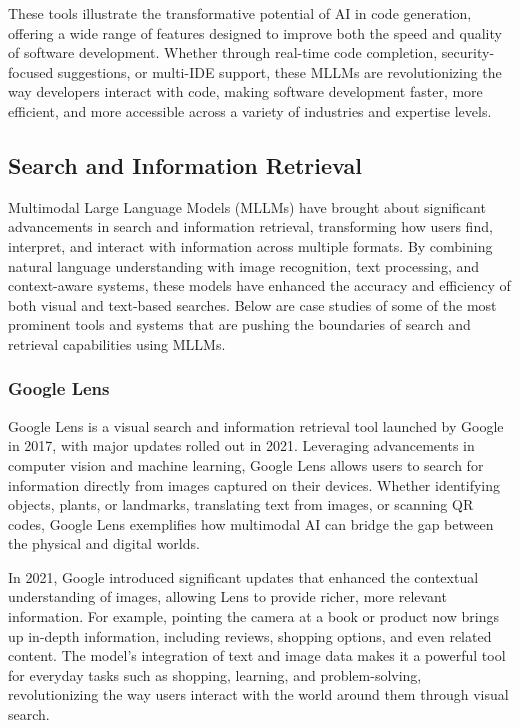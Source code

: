 These tools illustrate the transformative potential of AI in code generation, offering a wide range of features designed to improve both the speed and quality of software development. Whether through real-time code completion, security-focused suggestions, or multi-IDE support, these MLLMs are revolutionizing the way developers interact with code, making software development faster, more efficient, and more accessible across a variety of industries and expertise levels.

\subsection{Search and Information Retrieval}

Multimodal Large Language Models (MLLMs) have brought about significant advancements in search and information retrieval, transforming how users find, interpret, and interact with information across multiple formats. 
By combining natural language understanding with image recognition, text processing, and context-aware systems, these models have enhanced the accuracy and efficiency of both visual and text-based searches. 
Below are case studies of some of the most prominent tools and systems that are pushing the boundaries of search and retrieval capabilities using MLLMs.

\subsubsection{Google Lens}

Google Lens is a visual search and information retrieval tool launched by Google in 2017, with major updates rolled out in 2021. 
Leveraging advancements in computer vision and machine learning, Google Lens allows users to search for information directly from images captured on their devices. 
Whether identifying objects, plants, or landmarks, translating text from images, or scanning QR codes, Google Lens exemplifies how multimodal AI can bridge the gap between the physical and digital worlds.

In 2021, Google introduced significant updates that enhanced the contextual understanding of images, allowing Lens to provide richer, more relevant information. 
For example, pointing the camera at a book or product now brings up in-depth information, including reviews, shopping options, and even related content. 
The model’s integration of text and image data makes it a powerful tool for everyday tasks such as shopping, learning, and problem-solving, revolutionizing the way users interact with the world around them through visual search.

